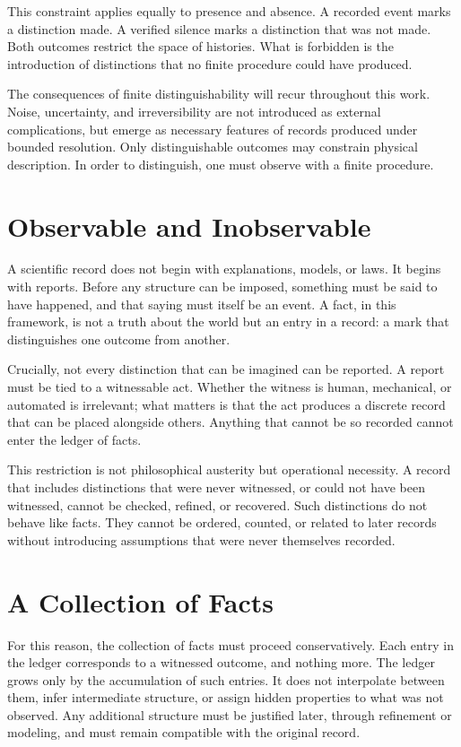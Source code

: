 This constraint applies equally to presence and absence. A recorded event marks
a distinction made. A verified silence marks a distinction that was not made.
Both outcomes restrict the space of histories. What is forbidden is
the introduction of distinctions that no finite procedure could have produced.

The consequences of finite distinguishability will recur throughout this work.
Noise, uncertainty, and irreversibility are not introduced as external
complications, but emerge as necessary features of records produced under
bounded resolution. Only distinguishable outcomes may constrain physical
description. In order to distinguish, one must observe with a finite
procedure.

\section{Observable and Inobservable}

A scientific record does not begin with explanations, models, or laws.
It begins with reports.  Before any structure can be imposed, something
must be said to have happened, and that saying must itself be an event.
A fact, in this framework, is not a truth about the world but an entry
in a record: a mark that distinguishes one outcome from another.

Crucially, not every distinction that can be imagined can be reported.
A report must be tied to a witnessable act.  Whether the witness is
human, mechanical, or automated is irrelevant; what matters is that the
act produces a discrete record that can be placed alongside others.
Anything that cannot be so recorded cannot enter the ledger of facts.

This restriction is not philosophical austerity but operational
necessity.  A record that includes distinctions that were never
witnessed, or could not have been witnessed, cannot be checked,
refined, or recovered.  Such distinctions do not behave like facts.
They cannot be ordered, counted, or related to later records without
introducing assumptions that were never themselves recorded.


\section{A Collection of Facts}
\label{sec:collection_of_facts}

For this reason, the collection of facts must proceed conservatively.
Each entry in the ledger corresponds to a witnessed outcome, and
nothing more.  The ledger grows only by the accumulation of such
entries.  It does not interpolate between them, infer intermediate
structure, or assign hidden properties to what was not observed.  Any
additional structure must be justified later, through refinement or
modeling, and must remain compatible with the original record.

